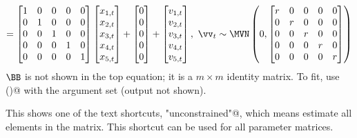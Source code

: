 \begin{gather*}
= \begin{bmatrix}1&0&0&0&0\\0&1&0&0&0\\0&0&1&0&0\\0&0&0&1&0\\0&0&0&0&1\end{bmatrix}
\begin{bmatrix}x_{1,t}\\x_{2,t}\\x_{3,t}\\x_{4,t}\\x_{5,t}\end{bmatrix}
+ \begin{bmatrix}0\\0\\0\\0\\0\end{bmatrix}
+ \begin{bmatrix}v_{1,t}\\ v_{2,t}\\ v_{3,t}\\ v_{4,t}\\ v_{5,t}\end{bmatrix}, 
 \textrm{ } \vv_t \sim \MVN\begin{pmatrix} 0,\begin{bmatrix}r&0&0&0&0\\0&r&0&0&0\\0&0&r&0&0\\0&0&0&r&0\\0&0&0&0&r\end{bmatrix} \end{pmatrix}  \\
\end{gather*}
$\BB$ is not shown in the top equation; it is a $m \times m$ identity matrix.  To fit, use \verb@MARSS()@ with the \verb@model@ argument set (output not shown).

This shows one of the text shortcuts, \verb@"unconstrained"@, which means estimate all elements in the matrix.  This shortcut can be used for all parameter matrices.  

